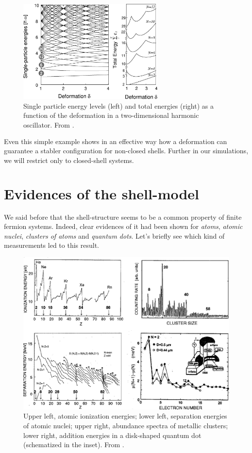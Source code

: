 \documentclass[a4paper,twoside,11pt]{book}
\begin{document}
\begin{figure}[H]
	\centering
    \includegraphics[width=0.65\textwidth]{Figure_2_Reimann}
    \caption{Single particle energy levels (left) and total energies (right) as a function of the deformation in a two-dimensional harmonic oscillator. From \cite{Reimann2002}.}
	\label{fig:Figure_2_Reimann}
\end{figure}

Even this simple example shows in an effective way how a deformation can guarantee a stabler configuration for non-closed shells. Further in our simulations, we will restrict only to closed-shell systems.

\section{Evidences of the shell-model}
\label{sec:shell_model_evidences}
We said before that the shell-structure seems to be a common property of finite fermion systems. Indeed, clear evidences of it had been shown for \emph{atoms}, \emph{atomic nuclei}, \emph{clusters of atoms} and \emph{quantum dots}. Let's briefly see which kind of measurements led to this result.

\begin{figure}[h]%
	\centering
    \includegraphics[width=\textwidth]{Figure_3_Reimann}
    \caption{Upper left, atomic ionization energies; lower left, separation energies of atomic nuclei; upper right, abundance spectra of metallic clusters; lower right, addition energies in a
disk-shaped quantum dot (schematized in the inset). From \cite{Reimann2002}.}
	\label{fig:Figure_3_Reimann}
\end{figure}
\end{document}
